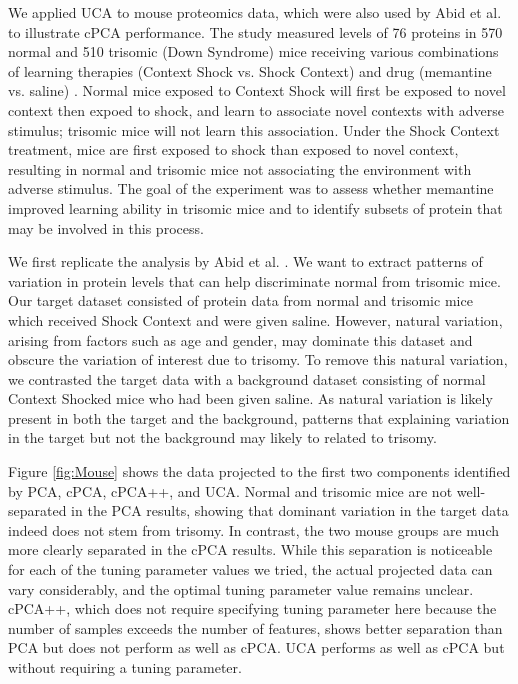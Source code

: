 \documentclass[12pt]{article}
\begin{document}
We applied UCA to mouse proteomics data, which were also used by Abid et al. \cite{Abid} to illustrate cPCA performance. The study measured levels of 76 proteins in 570 normal and 510 trisomic (Down Syndrome) mice receiving various combinations of learning therapies (Context Shock vs. Shock Context) and drug (memantine vs. saline) \cite{Ahmed, Higuera, Abid}. Normal mice exposed to Context Shock will first be exposed to novel context then expoed to shock, and learn to associate novel contexts with adverse stimulus; trisomic mice will not learn this association. Under the Shock Context treatment, mice are first exposed to shock than exposed to novel context, resulting in normal and trisomic mice not associating the environment with adverse stimulus. The goal of the experiment was to assess whether memantine improved learning ability in trisomic mice and to identify subsets of protein that may be involved in this process.

We first replicate the analysis by Abid et al. \cite{Abid}. We want to extract patterns of variation in protein levels that can help discriminate normal from trisomic mice. Our target dataset consisted of protein data from normal and trisomic mice which received Shock Context and were given saline. However, natural variation, arising from factors such as age and gender, may dominate this dataset and obscure the variation of interest due to trisomy. To remove this natural variation, we contrasted the target data with a background dataset consisting of normal Context Shocked mice who had been given saline. As natural variation is likely present in both the target and the background, patterns that explaining variation in the target but not the background may likely to related to trisomy.

Figure \ref{fig:Mouse} shows the data projected to the first two components identified by PCA, cPCA, cPCA++, and UCA. Normal and trisomic mice are not well-separated in the PCA results, showing that dominant variation in the target data indeed does not stem from trisomy. In contrast, the two mouse groups are much more clearly separated in the cPCA results. While this separation is noticeable for each of the tuning parameter values we tried, the actual projected data can vary considerably, and the optimal tuning parameter value remains unclear.
cPCA++, which does not require specifying tuning parameter here because the number of samples exceeds the number of features, shows better separation than PCA but does not perform as well as cPCA. UCA performs as well as cPCA but without requiring a tuning parameter.
\end{document}
